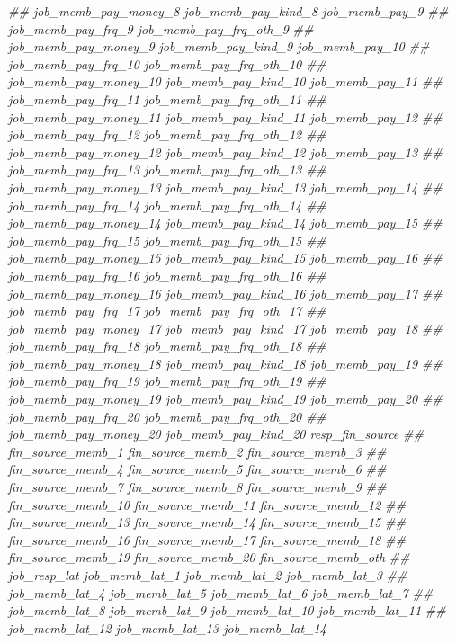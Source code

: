 \documentclass[
]{article}
\newenvironment{Shaded}{\begin{snugshade}}{\end{snugshade}}
\newcommand{\CommentTok}[1]{\textcolor[rgb]{0.56,0.35,0.01}{\textit{#1}}}
\begin{document}
\begin{Shaded}
\begin{Highlighting}[]
\CommentTok{##      job_memb_pay_money_8 job_memb_pay_kind_8 job_memb_pay_9}
\CommentTok{##      job_memb_pay_frq_9 job_memb_pay_frq_oth_9}
\CommentTok{##      job_memb_pay_money_9 job_memb_pay_kind_9 job_memb_pay_10}
\CommentTok{##      job_memb_pay_frq_10 job_memb_pay_frq_oth_10}
\CommentTok{##      job_memb_pay_money_10 job_memb_pay_kind_10 job_memb_pay_11}
\CommentTok{##      job_memb_pay_frq_11 job_memb_pay_frq_oth_11}
\CommentTok{##      job_memb_pay_money_11 job_memb_pay_kind_11 job_memb_pay_12}
\CommentTok{##      job_memb_pay_frq_12 job_memb_pay_frq_oth_12}
\CommentTok{##      job_memb_pay_money_12 job_memb_pay_kind_12 job_memb_pay_13}
\CommentTok{##      job_memb_pay_frq_13 job_memb_pay_frq_oth_13}
\CommentTok{##      job_memb_pay_money_13 job_memb_pay_kind_13 job_memb_pay_14}
\CommentTok{##      job_memb_pay_frq_14 job_memb_pay_frq_oth_14}
\CommentTok{##      job_memb_pay_money_14 job_memb_pay_kind_14 job_memb_pay_15}
\CommentTok{##      job_memb_pay_frq_15 job_memb_pay_frq_oth_15}
\CommentTok{##      job_memb_pay_money_15 job_memb_pay_kind_15 job_memb_pay_16}
\CommentTok{##      job_memb_pay_frq_16 job_memb_pay_frq_oth_16}
\CommentTok{##      job_memb_pay_money_16 job_memb_pay_kind_16 job_memb_pay_17}
\CommentTok{##      job_memb_pay_frq_17 job_memb_pay_frq_oth_17}
\CommentTok{##      job_memb_pay_money_17 job_memb_pay_kind_17 job_memb_pay_18}
\CommentTok{##      job_memb_pay_frq_18 job_memb_pay_frq_oth_18}
\CommentTok{##      job_memb_pay_money_18 job_memb_pay_kind_18 job_memb_pay_19}
\CommentTok{##      job_memb_pay_frq_19 job_memb_pay_frq_oth_19}
\CommentTok{##      job_memb_pay_money_19 job_memb_pay_kind_19 job_memb_pay_20}
\CommentTok{##      job_memb_pay_frq_20 job_memb_pay_frq_oth_20}
\CommentTok{##      job_memb_pay_money_20 job_memb_pay_kind_20 resp_fin_source}
\CommentTok{##      fin_source_memb_1 fin_source_memb_2 fin_source_memb_3}
\CommentTok{##      fin_source_memb_4 fin_source_memb_5 fin_source_memb_6}
\CommentTok{##      fin_source_memb_7 fin_source_memb_8 fin_source_memb_9}
\CommentTok{##      fin_source_memb_10 fin_source_memb_11 fin_source_memb_12}
\CommentTok{##      fin_source_memb_13 fin_source_memb_14 fin_source_memb_15}
\CommentTok{##      fin_source_memb_16 fin_source_memb_17 fin_source_memb_18}
\CommentTok{##      fin_source_memb_19 fin_source_memb_20 fin_source_memb_oth}
\CommentTok{##      job_resp_lat job_memb_lat_1 job_memb_lat_2 job_memb_lat_3}
\CommentTok{##      job_memb_lat_4 job_memb_lat_5 job_memb_lat_6 job_memb_lat_7}
\CommentTok{##      job_memb_lat_8 job_memb_lat_9 job_memb_lat_10 job_memb_lat_11}
\CommentTok{##      job_memb_lat_12 job_memb_lat_13 job_memb_lat_14}

\end{Highlighting}
\end{Shaded}
\end{document}
